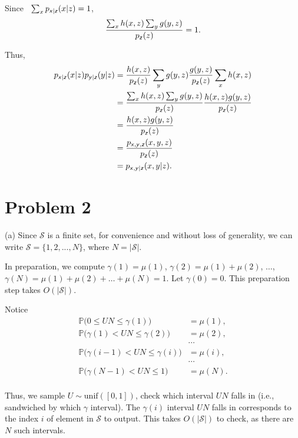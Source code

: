 \documentclass{article}
\newcommand{\s}[1]{\textsf{\textit{#1}}}
\newcommand{\qeds}{\hfill\qedsymbol}
\begin{document}
Since \, $\sum_x p_{\s{x}|\s{z}}(x|z) = 1$,
\begin{equation*}
	\frac{\sum_x h(x, z) \sum_y g(y, z)}{p_{\s{z}}(z)} = 1.
\end{equation*}

Thus,
\begin{align*}
	p_{\s{x}|\s{z}}(x|z)p_{\s{y}|\s{z}}(y|z) &= \frac{h(x, z)}{p_{\s{z}}(z)} \sum_y  g(y, z)\frac{g(y, z)}{p_{\s{z}}(z)} \sum_x  h(x, z) \\
	&= \frac{\sum_x h(x, z) \sum_y g(y, z)}{p_{\s{z}}(z)} \frac{h(x, z) g(y, z)}{p_{\s{z}}(z)}\\
	&= \frac{h(x, z) g(y, z)}{p_{\s{z}}(z)} \\
	&= \frac{p_{\s{x}, \s{y}, \s{z}}(x, y, z)}{p_{\s{z}}(z)} \\
	&= p_{\s{x},\s{y}|\s{z}}(x, y|z).
\end{align*} \qeds
\pagebreak


\section*{Problem 2}
(a)
%
Since $\mathscr{S}$ is a finite set, for convenience and without loss of generality,
we can write $\mathscr{S} = \{1, 2, ..., N\}$, where $N = |\mathscr{S}|$.

In preparation, we compute
$\gamma(1) = \mu(1)$, $\gamma(2) = \mu(1) + \mu(2)$, $\dots$,
$\gamma(N) = \mu(1) + \mu(2) + \dots + \mu(N) = 1$.
Let $\gamma(0) = 0$.
This preparation step takes $O(|\mathscr{S}|)$.

Notice
\begin{align*}
\mathbb{P}\Big(0 \leq UN \leq \gamma(1)\Big) &= \mu(1), \\
\mathbb{P}\Big(\gamma(1) < UN \leq \gamma(2)\Big) &= \mu(2), \\
	& \cdots \\
\mathbb{P}\Big(\gamma(i - 1) < UN \leq \gamma(i)\Big) &= \mu(i), \\	
	& \cdots \\
\mathbb{P}\Big(\gamma(N - 1) < UN \leq 1\Big) &= \mu(N). \\
\end{align*}

Thus, we sample $U \sim \text{unif}([0, 1])$, check which interval $UN$ falls in (i.e., sandwiched by which $\gamma$ interval). The $\gamma(i)$ interval $UN$ falls in corresponds to the index $i$ of element in $\mathscr{S}$ to output. This takes $O(|\mathscr{S}|)$ to check, as there are $N$ such intervals.
\\
\end{document}
